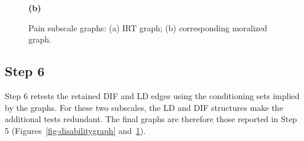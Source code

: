 \begin{figure}[ht]
\begin{minipage}[t]{0.48\textwidth}

\vspace{0.3em}
\textbf{(b)}
\end{minipage}

\caption{
Pain subscale graphs: (a) IRT graph; (b) corresponding moralized graph.
}\label{fig-paingraph}
\end{figure}


\subsection{Step 6}
Step 6 retests the retained DIF and LD edges using the conditioning sets implied by the graphs. For these two subscales, the LD and DIF structures make the additional tests redundant. The final graphs are therefore those reported in Step 5 (Figures~\ref{fig-disabilitygraph} and~\ref{fig-paingraph}).


